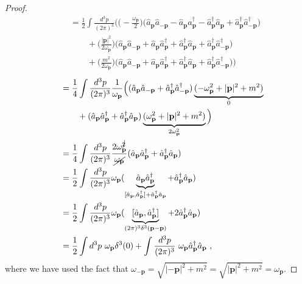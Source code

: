 \begin{proof}
\begin{equation*}
\begin{aligned}
            \phantom{\hat H} & = \frac{1}{2} \int \frac{d^3 p}{(2\pi)^3} \Big ( \Big (-\frac{\omega_{\mathbf p}}{2} \Big) \Big (\hat a_{\mathbf p} \hat a_{- \mathbf p} - \hat a_{\mathbf p} \hat a_{\mathbf p}^\dagger - \hat a_{\mathbf p}^\dagger \hat a_{\mathbf p} + \hat a_{\mathbf p}^\dagger \hat a_{- \mathbf p}^\dagger \Big) \\ & \qquad + \Big (\frac{|\mathbf p|^2}{2 \omega_{\mathbf p}} \Big) \Big (\hat a_{\mathbf p} \hat a_{- \mathbf p} + \hat a_{\mathbf p} \hat a_{\mathbf p}^\dagger + \hat a_{\mathbf p}^\dagger \hat a_{\mathbf p} + \hat a_{\mathbf p}^\dagger \hat a_{- \mathbf p}^\dagger \Big) \\ & \qquad + \Big ( \frac{m^2}{2 \omega_{\mathbf p}} \Big) \Big (\hat a_{\mathbf p} \hat a_{- \mathbf p}+ \hat a_{\mathbf p} \hat a_{\mathbf p}^\dagger  + \hat a_{\mathbf p}^\dagger \hat a_{\mathbf p} + \hat a_{\mathbf p}^\dagger \hat a_{- \mathbf p}^\dagger \Big) \Big)
        \end{aligned}
        \end{equation*}
        \begin{equation*}
        \begin{aligned}
            \phantom{\hat H} & = \frac{1}{4} \int \frac{d^3 p}{(2\pi)^3} \frac{1}{\omega_{\mathbf p}} \Big ( (\hat a_{\mathbf p} \hat a_{- \mathbf p} + \hat a_{\mathbf p}^\dagger \hat a_{- \mathbf p}^\dagger ) \underbrace{(- \omega_{\mathbf p}^2 + | \mathbf p|^2 + m^2 )}_0 \\ & \qquad + (\hat a_{\mathbf p} \hat a_{\mathbf p}^\dagger + \hat a_{\mathbf p}^\dagger \hat a_{\mathbf p} ) \underbrace{(\omega_{\mathbf p}^2 + | \mathbf p|^2 + m^2 )}_{2\omega_{\mathbf p}^2} \Big) \\ & = \frac{1}{4} \int \frac{d^3 p}{(2\pi)^3} \frac{2 \omega_{\mathbf p}^{\cancel{2}}}{\cancel{\omega_{\mathbf p}}} (\hat a_{\mathbf p} \hat a_{\mathbf p}^\dagger + \hat a_{\mathbf p}^\dagger \hat a_{\mathbf p}) \\ & = \frac{1}{2} \int \frac{d^3 p}{(2\pi)^3} \omega_{\mathbf p} (\underbrace{\hat a_{\mathbf p} \hat a_{\mathbf p}^\dagger}_{[\hat a_{\mathbf p}, \hat a_{\mathbf p}^\dagger] + \hat a_{\mathbf p}^\dagger \hat a_{\mathbf p}} + \hat a_{\mathbf p}^\dagger \hat a_{\mathbf p}) \\ & = \frac{1}{2} \int \frac{d^3 p}{(2\pi)^3} \omega_{\mathbf p} (\underbrace{[\hat a_{\mathbf p}, \hat a_{\mathbf p}^\dagger]}_{(2\pi)^3 \delta^3 (\mathbf p - \mathbf p)} + 2 \hat a_{\mathbf p}^\dagger \hat a_{\mathbf p}) \\ & = \frac{1}{2} \int d^3 p ~ \omega_{\mathbf p} \delta^3 (0) + \int \frac{d^3 p}{(2\pi)^3} ~ \omega_{\mathbf p}\hat a_{\mathbf p}^\dagger \hat a_{\mathbf p} ~,
        \end{aligned}
        \end{equation*}
        where we have used the fact that $\omega_{- \mathbf p} = \sqrt{| - \mathbf p|^2 + m^2} = \sqrt{|\mathbf p|^2 + m^2} = \omega_{\mathbf p}$. 

    \end{proof}

